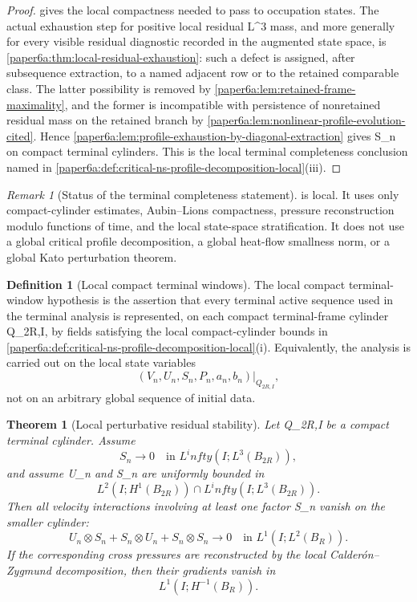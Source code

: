 \documentclass[11pt]{amsart}
\def\({}%
\def\){}%
\def\infty{infty}%
\theoremstyle{plain}
\newtheorem{theorem}{Theorem}[section]
\theoremstyle{definition}
\newtheorem{definition}[definition]{Definition}
\theoremstyle{remark}
\newtheorem{remark}[remark]{Remark}
\begin{document}
\begin{proof}
 gives the local compactness
needed to pass to occupation states.  The actual exhaustion step for positive
local residual \(L^3\) mass, and more generally for every visible residual
diagnostic recorded in the augmented state space, is
\cref{paper6a:thm:local-residual-exhaustion}: such a defect is assigned, after
subsequence extraction, to a named adjacent row or to the retained comparable
class.  The latter possibility is removed by
\cref{paper6a:lem:retained-frame-maximality}, and the former is incompatible
with persistence of nonretained residual mass on the retained branch by
\cref{paper6a:lem:nonlinear-profile-evolution-cited}.  Hence
\cref{paper6a:lem:profile-exhaustion-by-diagonal-extraction} gives \(S_n\)
on compact terminal cylinders.  This is the local terminal completeness
conclusion named in
\cref{paper6a:def:critical-ns-profile-decomposition-local}\textup{(iii)}.
\end{proof}

\begin{remark}[Status of the terminal completeness statement]
\label{paper6a:rem:profile-decomposition-status}
 is local.  It
uses only compact-cylinder estimates, Aubin--Lions compactness, pressure
reconstruction modulo functions of time, and the local state-space
stratification.  It does not use a global critical profile decomposition, a
global heat-flow smallness norm, or a global Kato perturbation theorem.
\end{remark}

\begin{definition}[Local compact terminal windows]
\label{paper6a:def:bounded-critical-terminal-sequences}
The local compact terminal-window hypothesis is the assertion that every
terminal active sequence used in the terminal analysis is represented, on each
compact terminal-frame cylinder \(Q_{2R,I}\), by fields satisfying the local
compact-cylinder bounds in
\cref{paper6a:def:critical-ns-profile-decomposition-local}\textup{(i)}.  Equivalently,
the analysis is carried out on the local state variables
\[
  (V_n,U_n,S_n,P_n,a_n,b_n)\big|_{Q_{2R,I}},
\]
not on an arbitrary global sequence of initial data.
\end{definition}

\begin{theorem}[Local perturbative residual stability]
\label{paper6a:thm:kato-small-data-critical-stability}
Let \(Q_{2R,I}\) be a compact terminal cylinder.  Assume
\[
  S_n\to0\quad\text{in }L^\infty(I;L^3(B_{2R})),
\]
and assume \(U_n\) and \(S_n\) are uniformly bounded in
\[
  L^2(I;H^1(B_{2R}))\cap L^\infty(I;L^3(B_{2R})).
\]
Then all velocity interactions involving at least one factor \(S_n\) vanish on
the smaller cylinder:
\[
  U_n\otimes S_n+S_n\otimes U_n+S_n\otimes S_n
  \to0
  \quad\text{in }L^1(I;L^2(B_R)).
\]
If the corresponding cross pressures are reconstructed by the local
Calder\'on--Zygmund decomposition, then their gradients vanish in
\[
  L^1(I;H^{-1}(B_R)).
\]
\end{theorem}
\end{document}
